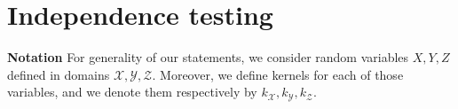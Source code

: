 \documentclass{article} %
\begin{document}

\section{Independence testing} 
{\bf Notation} 
For generality of our statements, we consider random variables $X, Y, Z$ defined in domains $\mathcal{X}, \mathcal{Y}, \mathcal{Z}$. Moreover,
we define kernels for each of those variables, and we denote them respectively by $k_{\mathcal{X}}, k_{\mathcal{Y}}, k_{\mathcal{Z}}$.
\end{document}
